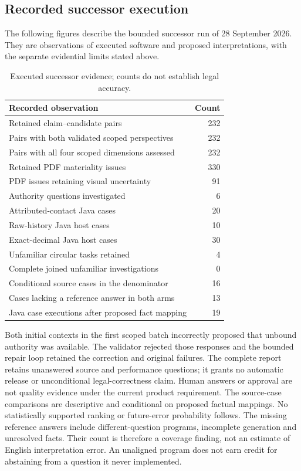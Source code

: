 
\subsection{Recorded successor execution}
The following figures describe the bounded successor run of 28 September 2026.
They are observations of executed software and proposed interpretations, with
the separate evidential limits stated above.
\begin{table}[H]\centering\small
\begin{tabularx}{\textwidth}{Y r}
\toprule Recorded observation & Count \\\midrule
Retained claim--candidate pairs & 232 \\
Pairs with both validated scoped perspectives & 232 \\
Pairs with all four scoped dimensions assessed & 232 \\
Retained PDF materiality issues & 330 \\
PDF issues retaining visual uncertainty & 91 \\
Authority questions investigated & 6 \\
Attributed-contact Java cases & 20 \\
Raw-history Java host cases & 10 \\
Exact-decimal Java host cases & 30 \\
Unfamiliar circular tasks retained & 4 \\
Complete joined unfamiliar investigations & 0 \\
Conditional source cases in the denominator & 16 \\
Cases lacking a reference answer in both arms & 13 \\
Java case executions after proposed fact mapping & 19 \\
\bottomrule\end{tabularx}
\caption{Executed successor evidence; counts do not establish legal accuracy.}
\end{table}
Both initial contexts in the first scoped batch incorrectly proposed that
unbound authority was available. The validator rejected those responses and
the bounded repair loop retained the correction and original failures. The
complete report retains unanswered source and performance questions; it grants
no automatic release or unconditional legal-correctness claim. Human answers or
approval are not quality evidence under the current product requirement.
The source-case comparisons are
descriptive and conditional on proposed factual mappings. No statistically
supported ranking or future-error probability follows.
The missing reference answers include different-question programs, incomplete
generation and unresolved facts. Their count is therefore a coverage finding,
not an estimate of English interpretation error. An unaligned program does not
earn credit for abstaining from a question it never implemented.

